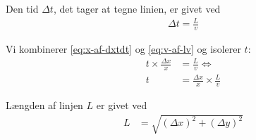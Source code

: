 
Den tid $\Delta t$, det tager at tegne linien, er givet ved
\begin{align}
\Delta t = \frac Lv \label{eq:v-af-lv}
\end{align}

Vi kombinerer \eqref{eq:x-af-dxtdt} og \eqref{eq:v-af-lv} og isolerer
$t$:
\begin{align}
t \times \frac{\Delta x}x &= \frac Lv \Leftrightarrow \\
t &= \frac{\Delta x}x \times \frac Lv \label{eq:t-af-dxxlv}
\end{align}

Længden af linjen $L$ er givet ved
\begin{align}
L &= \sqrt{\left(\Delta x\right)^2 + \left(\Delta y\right)^2}
\end{align}

